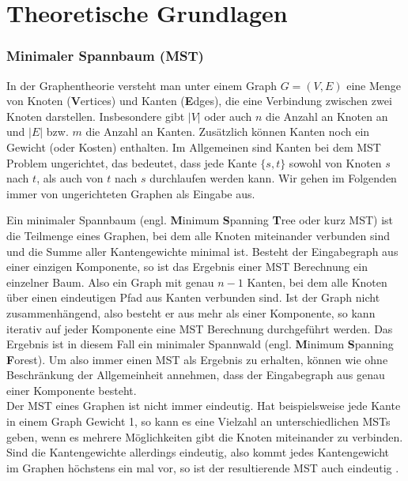 \chapter{Theoretische Grundlagen}\label{Grundlagen}


\subsection{Minimaler Spannbaum (MST)}
In der Graphentheorie versteht man unter einem Graph $G = (V,E)$ eine Menge von Knoten (\textbf{V}ertices) und Kanten (\textbf{E}dges), die eine Verbindung zwischen zwei Knoten darstellen. Insbesondere gibt $|V|$ oder auch $n$ die Anzahl an Knoten an und $|E|$ bzw. $m$ die Anzahl an Kanten. Zusätzlich können Kanten noch ein Gewicht (oder Kosten) enthalten. 
Im Allgemeinen sind Kanten bei dem MST Problem ungerichtet, das bedeutet, dass jede Kante $\{s,t\}$ sowohl von Knoten $s$ nach $t$, als auch von $t$ nach $s$ durchlaufen werden kann. Wir gehen im Folgenden immer von ungerichteten Graphen als Eingabe aus.

Ein minimaler Spannbaum (engl. \textbf{M}inimum \textbf{S}panning \textbf{T}ree oder kurz MST) ist die Teilmenge eines Graphen, bei dem alle Knoten miteinander verbunden sind und die Summe aller Kantengewichte minimal ist. Besteht der Eingabegraph aus einer einzigen Komponente, so ist das Ergebnis einer MST Berechnung ein einzelner Baum. Also ein Graph mit genau $n-1$ Kanten, bei dem alle Knoten über einen eindeutigen Pfad aus Kanten verbunden sind.
Ist der Graph nicht zusammenhängend, also besteht er aus mehr als einer Komponente, so kann iterativ auf jeder Komponente eine MST Berechnung durchgeführt werden. Das Ergebnis ist in diesem Fall ein minimaler Spannwald (engl. \textbf{M}inimum \textbf{S}panning \textbf{F}orest).
Um also immer einen MST als Ergebnis zu erhalten, können wie ohne Beschränkung der Allgemeinheit annehmen, dass der Eingabegraph aus genau einer Komponente besteht.\\
Der MST eines Graphen ist nicht immer eindeutig. Hat beispielsweise jede Kante in einem Graph Gewicht 1, so kann es eine Vielzahl an unterschiedlichen MSTs geben, wenn es mehrere Möglichkeiten gibt die Knoten miteinander zu verbinden. Sind die Kantengewichte allerdings eindeutig, also kommt jedes Kantengewicht im Graphen höchstens ein mal vor, so ist der resultierende MST auch eindeutig \cite{sanders2019sequential}. 


